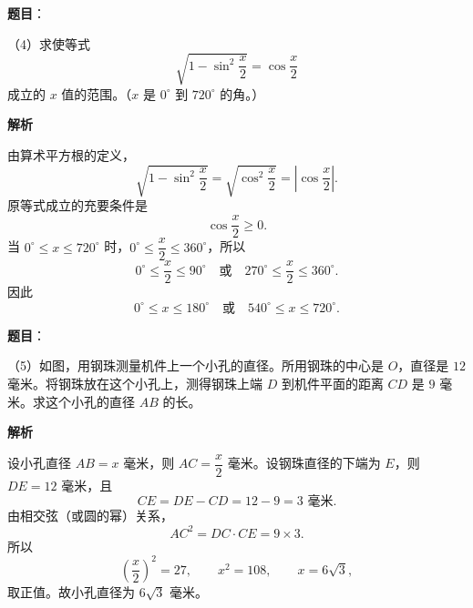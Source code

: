 \begin{answer}

\textbf{题目}：

（4）求使等式
\nopagebreak[4]
\[
\sqrt{1-\sin^2\frac{x}{2}}=\cos\frac{x}{2}
\]
成立的 $x$ 值的范围。（$x$ 是 $0^\circ$ 到 $720^\circ$ 的角。）

\textbf{解析}

由算术平方根的定义，
\nopagebreak[4]
\[
\sqrt{1-\sin^2\frac{x}{2}}=
\sqrt{\cos^2\frac{x}{2}}=\left|\cos\frac{x}{2}\right|.
\]
原等式成立的充要条件是
\nopagebreak[4]
\[
\cos\frac{x}{2}\ge0.
\]
当 $0^\circ\le x\le720^\circ$ 时，$0^\circ\le\dfrac{x}{2}\le360^\circ$，所以
\nopagebreak[4]
\[
0^\circ\le\frac{x}{2}\le90^\circ
\quad\text{或}\quad
270^\circ\le\frac{x}{2}\le360^\circ.
\]
因此
\nopagebreak[4]
\[
0^\circ\le x\le180^\circ
\quad\text{或}\quad
540^\circ\le x\le720^\circ.
\]


\end{answer}
\begin{answer}

\textbf{题目}：

（5）如图，用钢珠测量机件上一个小孔的直径。所用钢珠的中心是 $O$，直径是 $12$ 毫米。将钢珠放在这个小孔上，测得钢珠上端 $D$ 到机件平面的距离 $CD$ 是 $9$ 毫米。求这个小孔的直径 $AB$ 的长。
\nopagebreak[4]
\begin{center}\end{center}
\nopagebreak[4]
\textbf{解析}

设小孔直径 $AB=x$ 毫米，则 $AC=\dfrac{x}{2}$ 毫米。设钢珠直径的下端为 $E$，则 $DE=12$ 毫米，且
\nopagebreak[4]
\[
CE=DE-CD=12-9=3\text{ 毫米}.
\]
由相交弦（或圆的幂）关系，
\nopagebreak[4]
\[
AC^2=DC\cdot CE=9\times3.
\]
所以
\nopagebreak[4]
\[
\left(\frac{x}{2}\right)^2=27,
\qquad x^2=108,
\qquad x=6\sqrt3,
\]
取正值。故小孔直径为 $6\sqrt3$ 毫米。


\end{answer}
